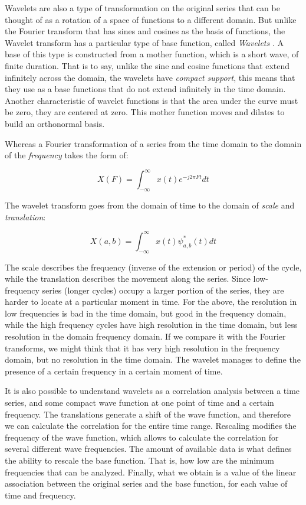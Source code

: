 \documentclass[a4paper]{article}
\begin{document}
Wavelets are also a type of transformation on the original series that can be thought of as a rotation of a space of functions to a different domain. But unlike the Fourier transform that has sines and cosines as the basis of functions, the Wavelet transform has a particular type of base function, called \textit{Wavelets} \cite{castro1995wavelets}. A base of this type is constructed from a mother function, which is a short wave, of finite duration. That is to say, unlike the sine and cosine functions that extend infinitely across the domain, the wavelets have \textit{compact support}, this means that they use as a base functions that do not extend infinitely in the time domain. Another characteristic of wavelet functions is that the area under the curve must be zero, they are centered at zero. This mother function moves and dilates to build an orthonormal basis.

Whereas a Fourier transformation of a series from the time domain to the domain of the \textit{frequency} takes the form of:

$$
X(F)=\int_{-\infty}^{\infty} x(t) e^{-j2\pi Ft}dt
$$

The wavelet transform goes from the domain of time to the domain of \textit{scale} and \textit{translation}:

$$
X(a,b)=\int_{-\infty}^{\infty} x(t) \psi^*_{a,b}(t)dt
$$

The scale describes the frequency (inverse of the extension or period) of the cycle, while the translation describes the movement along the series. Since low-frequency series (longer cycles) occupy a larger portion of the series, they are harder to locate at a particular moment in time. For the above, the resolution in low frequencies is bad in the time domain, but good in the frequency domain, while the high frequency cycles have high resolution in the time domain, but less resolution in the domain frequency domain. If we compare it with the Fourier transforms, we might think that it has very high resolution in the frequency domain, but no resolution in the time domain. The wavelet manages to define the presence of a certain frequency in a certain moment of time.

It is also possible to understand wavelets as a correlation  analysis between a time series, and some compact wave function at one point of time and a certain frequency. The translations generate a shift of the wave function, and therefore we can calculate the correlation for the entire time range. Rescaling modifies the frequency of the wave function, which allows to calculate the correlation for several different wave frequencies. The amount of available data is what defines the ability to rescale the base function. That is, how low are the minimum frequencies that can be analyzed. Finally, what we obtain is a value of the linear association between the original series and the base function, for each value of time and frequency.
\end{document}
